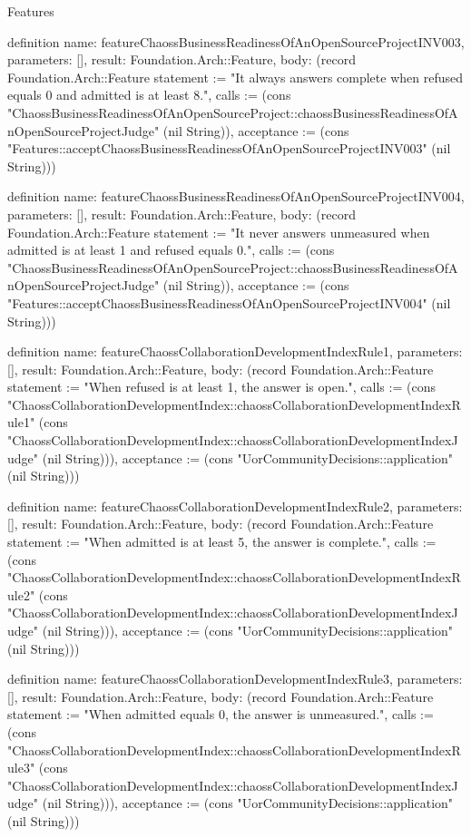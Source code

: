 \begin{lexlean}{Features}
\begin{semanticmodule}
definition{
  name: featureChaossBusinessReadinessOfAnOpenSourceProjectINV003,
  parameters: [],
  result: Foundation.Arch::Feature,
  body: (record Foundation.Arch::Feature {statement := "It always answers complete when refused equals 0 and admitted is at least 8.", calls := (cons "ChaossBusinessReadinessOfAnOpenSourceProject::chaossBusinessReadinessOfAnOpenSourceProjectJudge" (nil String)), acceptance := (cons "Features::acceptChaossBusinessReadinessOfAnOpenSourceProjectINV003" (nil String))})
}

definition{
  name: featureChaossBusinessReadinessOfAnOpenSourceProjectINV004,
  parameters: [],
  result: Foundation.Arch::Feature,
  body: (record Foundation.Arch::Feature {statement := "It never answers unmeasured when admitted is at least 1 and refused equals 0.", calls := (cons "ChaossBusinessReadinessOfAnOpenSourceProject::chaossBusinessReadinessOfAnOpenSourceProjectJudge" (nil String)), acceptance := (cons "Features::acceptChaossBusinessReadinessOfAnOpenSourceProjectINV004" (nil String))})
}

definition{
  name: featureChaossCollaborationDevelopmentIndexRule1,
  parameters: [],
  result: Foundation.Arch::Feature,
  body: (record Foundation.Arch::Feature {statement := "When refused is at least 1, the answer is open.", calls := (cons "ChaossCollaborationDevelopmentIndex::chaossCollaborationDevelopmentIndexRule1" (cons "ChaossCollaborationDevelopmentIndex::chaossCollaborationDevelopmentIndexJudge" (nil String))), acceptance := (cons "UorCommunityDecisions::application" (nil String))})
}

definition{
  name: featureChaossCollaborationDevelopmentIndexRule2,
  parameters: [],
  result: Foundation.Arch::Feature,
  body: (record Foundation.Arch::Feature {statement := "When admitted is at least 5, the answer is complete.", calls := (cons "ChaossCollaborationDevelopmentIndex::chaossCollaborationDevelopmentIndexRule2" (cons "ChaossCollaborationDevelopmentIndex::chaossCollaborationDevelopmentIndexJudge" (nil String))), acceptance := (cons "UorCommunityDecisions::application" (nil String))})
}

definition{
  name: featureChaossCollaborationDevelopmentIndexRule3,
  parameters: [],
  result: Foundation.Arch::Feature,
  body: (record Foundation.Arch::Feature {statement := "When admitted equals 0, the answer is unmeasured.", calls := (cons "ChaossCollaborationDevelopmentIndex::chaossCollaborationDevelopmentIndexRule3" (cons "ChaossCollaborationDevelopmentIndex::chaossCollaborationDevelopmentIndexJudge" (nil String))), acceptance := (cons "UorCommunityDecisions::application" (nil String))})
}


\end{semanticmodule}
\end{lexlean}
